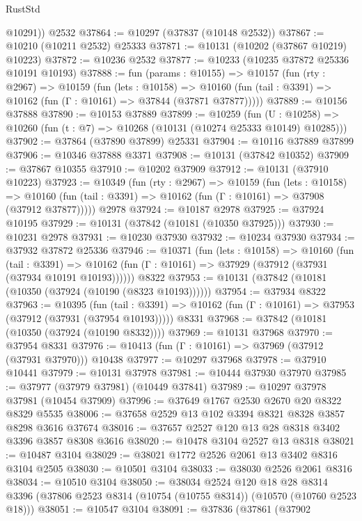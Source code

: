 \begin{lexlean}{RustStd}
\begin{coremodule}
        @10291))
    @2532
@37864 := @10297 (@37837 (@10148 @2532))
@37867 := @10210 (@10211 @2532) @25333
@37871 := @10131 (@10202 (@37867 @10219) @10223)
@37872 := @10236 @2532
@37877 := @10233 (@10235 @37872 @25336 @10191 @10193)
@37888 := fun (params : @10155) =>
  @10157
    (fun (rty : @2967) =>
    @10159
      (fun (lets : @10158) =>
      @10160 (fun (tail : @3391) => @10162 (fun (Γ : @10161) => @37844 (@37871 @37877)))))
@37889 := @10156 @37888
@37890 := @10153 @37889
@37899 := @10259
    (fun (U : @10258) => @10260 (fun (t : @7) => @10268 (@10131 (@10274 @25333 @10149) @10285)))
@37902 := @37864 (@37890 @37899) @25331
@37904 := @10116 @37889 @37899
@37906 := @10346 @37888 @3371
@37908 := @10131 (@37842 @10352)
@37909 := @37867 @10355
@37910 := @10202 @37909
@37912 := @10131 (@37910 @10223)
@37923 := @10349
    (fun (rty : @2967) =>
    @10159
      (fun (lets : @10158) =>
      @10160 (fun (tail : @3391) => @10162 (fun (Γ : @10161) => @37908 (@37912 @37877)))))
    @2978
@37924 := @10187 @2978
@37925 := @37924 @10195
@37929 := @10131 (@37842 (@10181 (@10350 @37925)))
@37930 := @10231 @2978
@37931 := @10230 @37930
@37932 := @10234 @37930
@37934 := @37932 @37872 @25336
@37946 := @10371
    (fun (lets : @10158) =>
    @10160
      (fun (tail : @3391) =>
      @10162 (fun (Γ : @10161) => @37929 (@37912 (@37931 (@37934 @10191 @10193))))))
    @8322
@37953 := @10131 (@37842 (@10181 (@10350 (@37924 (@10190 (@8323 @10193))))))
@37954 := @37934 @8322
@37963 := @10395
    (fun (tail : @3391) => @10162 (fun (Γ : @10161) => @37953 (@37912 (@37931 (@37954 @10193)))))
    @8331
@37968 := @37842 (@10181 (@10350 (@37924 (@10190 @8332))))
@37969 := @10131 @37968
@37970 := @37954 @8331
@37976 := @10413 (fun (Γ : @10161) => @37969 (@37912 (@37931 @37970))) @10438
@37977 := @10297 @37968
@37978 := @37910 @10441
@37979 := @10131 @37978
@37981 := @10444 @37930 @37970
@37985 := @37977 (@37979 @37981) (@10449 @37841)
@37989 := @10297 @37978 @37981 (@10454 @37909)
@37996 := @37649 @1767 @2530 @2670 @20 @8322 @8329 @5535
@38006 := @37658 @2529 @13 @102 @3394 @8321 @8328 @3857 @8298 @3616 @37674
@38016 := @37657 @2527 @120 @13 @28 @8318 @3402 @3396 @3857 @8308 @3616
@38020 := @10478 @3104 @2527 @13 @8318
@38021 := @10487 @3104
@38029 := @38021 @1772 @2526 @2061 @13 @3402 @8316 @3104 @2505
@38030 := @10501 @3104
@38033 := @38030 @2526 @2061 @8316
@38034 := @10510 @3104
@38050 := @38034
    @2524
    @120
    @18
    @28
    @8314
    @3396
    (@37806 @2523 @8314 (@10754 (@10755 @8314)) (@10570 (@10760 @2523 @18)))
@38051 := @10547 @3104
@38091 := @37836
    (@37861
      (@37902

\end{coremodule}
\end{lexlean}
